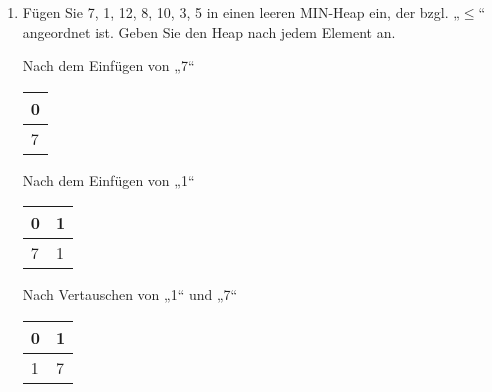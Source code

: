 \documentclass{bschlangaul-aufgabe}
\begin{document}
\begin{enumerate}
\begin{enumerate}
\begin{liDiagramm}{Nach Löschen von „1“}
\end{liDiagramm}


\item Fügen Sie 7, 1, 12, 8, 10, 3, 5 in einen leeren MIN-Heap ein,
der bzgl. „$\leq$“ angeordnet ist.
Geben Sie den Heap nach jedem Element an.

\begin{liDiagramm}{Nach dem Einfügen von „7“}
\begin{tabular}{l}
\bf{0} \\
\hline
7      \\
\end{tabular}

\end{liDiagramm}

\begin{liDiagramm}{Nach dem Einfügen von „1“}
\begin{tabular}{ll}
\bf{0} & \bf{1} \\
\hline
7      & 1      \\
\end{tabular}

\end{liDiagramm}

\begin{liDiagramm}{Nach Vertauschen von „1“ und „7“}
\begin{tabular}{ll}
\bf{0} & \bf{1} \\
\hline
1      & 7      \\
\end{tabular}

\end{liDiagramm}


\end{enumerate}
\end{enumerate}
\end{document}
